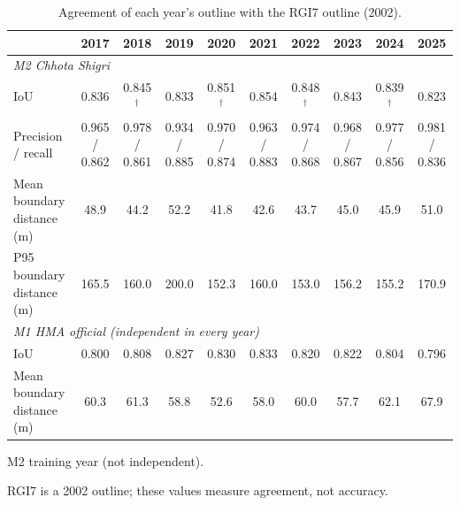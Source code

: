 \documentclass[10pt]{article}
\newcommand{\tr}{$^\dagger$}   %
\begin{document}
\begin{table}
\centering\footnotesize
\setlength{\tabcolsep}{3.5pt}
\begin{threeparttable}
\caption{Agreement of each year's outline with the RGI7 outline (2002).}
\label{tab:all_agreement}
\begin{tabular}{l ccccccccc}
\toprule
 & \textbf{2017} & \textbf{2018} & \textbf{2019} & \textbf{2020} & \textbf{2021} & \textbf{2022} & \textbf{2023} & \textbf{2024} & \textbf{2025} \\
\midrule
\multicolumn{10}{l}{\textit{M2 Chhota Shigri}} \\
IoU                                & 0.836 & 0.845\tr & 0.833 & 0.851\tr & 0.854 & 0.848\tr & 0.843 & 0.839\tr & 0.823 \\
Precision / recall                 & 0.965 / 0.862 & 0.978 / 0.861 & 0.934 / 0.885 & 0.970 / 0.874 & 0.963 / 0.883 & 0.974 / 0.868 & 0.968 / 0.867 & 0.977 / 0.856 & 0.981 / 0.836 \\
Mean boundary distance (m)         & 48.9 & 44.2 & 52.2 & 41.8 & 42.6 & 43.7 & 45.0 & 45.9 & 51.0 \\
P95 boundary distance (m)          & 165.5 & 160.0 & 200.0 & 152.3 & 160.0 & 153.0 & 156.2 & 155.2 & 170.9 \\
\midrule
\multicolumn{10}{l}{\textit{M1 HMA official (independent in every year)}} \\
IoU                                & 0.800 & 0.808 & 0.827 & 0.830 & 0.833 & 0.820 & 0.822 & 0.804 & 0.796 \\
Mean boundary distance (m)         & 60.3 & 61.3 & 58.8 & 52.6 & 58.0 & 60.0 & 57.7 & 62.1 & 67.9 \\
\bottomrule
\end{tabular}
\begin{tablenotes}\footnotesize
\item[\tr] M2 training year (not independent).
\item RGI7 is a 2002 outline; these values measure agreement, not accuracy.
\end{tablenotes}
\end{threeparttable}
\end{table}
\end{document}
